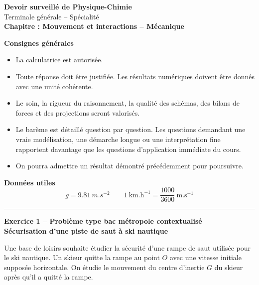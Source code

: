 \documentclass[11pt,a4paper]{article}
\begin{document}
\begin{center}
    {\LARGE \textbf{Devoir surveillé de Physique-Chimie}}\\[0.2cm]
    {\large Terminale générale -- Spécialité}\\[0.2cm]
    \textbf{Chapitre : Mouvement et interactions -- Mécanique}\\[0.3cm]
\end{center}

\vspace{0.2cm}

\noindent\textbf{Consignes générales}
\begin{itemize}[leftmargin=0.7cm]
    \item La calculatrice est autorisée.
    \item Toute réponse doit être justifiée. Les résultats numériques doivent être donnés avec une unité cohérente.
    \item Le soin, la rigueur du raisonnement, la qualité des schémas, des bilans de forces et des projections seront valorisés.
    \item Le barème est détaillé question par question. Les questions demandant une vraie modélisation, une démarche longue ou une interprétation fine rapportent davantage que les questions d’application immédiate du cours.
    \item On pourra admettre un résultat démontré précédemment pour poursuivre.
\end{itemize}

\vspace{0.2cm}

\noindent\textbf{Données utiles}
\[
g=\SI{9.81}{m.s^{-2}}
\qquad
1~\text{km.h}^{-1}=\frac{1000}{3600}~\text{m.s}^{-1}
\]

\vspace{0.2cm}
\hrule
\vspace{0.3cm}

\begin{center}
\textbf{\large Exercice 1 -- Problème type bac métropole contextualisé}\\
\textbf{Sécurisation d’une piste de saut à ski nautique}
\end{center}

Une base de loisirs souhaite étudier la sécurité d’une rampe de saut utilisée pour le ski nautique. Un skieur quitte la rampe au point $O$ avec une vitesse initiale supposée horizontale. On étudie le mouvement du centre d’inertie $G$ du skieur après qu’il a quitté la rampe.
\end{document}
